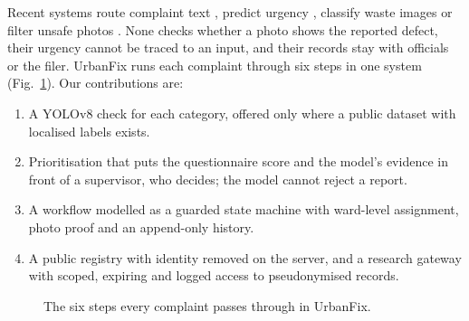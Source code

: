 \documentclass[conference]{IEEEtran}
\begin{document}
Recent systems route complaint text \cite{citiwatch,smartcity}, predict urgency \cite{cholke}, classify waste images \cite{regenx} or filter unsafe photos \cite{civicmate}. None checks whether a photo shows the reported defect, their urgency cannot be traced to an input, and their records stay with officials or the filer. UrbanFix runs each complaint through six steps in one system (Fig.~\ref{fig:loop}). Our contributions are:
\begin{enumerate}
\item A YOLOv8 check \cite{yolov8} for each category, offered only where a public dataset with localised labels exists.
\item Prioritisation that puts the questionnaire score and the model's evidence in front of a supervisor, who decides; the model cannot reject a report.
\item A workflow modelled as a guarded state machine with ward-level assignment, photo proof and an append-only history.
\item A public registry with identity removed on the server, and a research gateway with scoped, expiring and logged access to pseudonymised records.
\end{enumerate}

\begin{figure}[t]
\centering
{}
\caption{The six steps every complaint passes through in UrbanFix.}
\label{fig:loop}
\end{figure}
\end{document}
